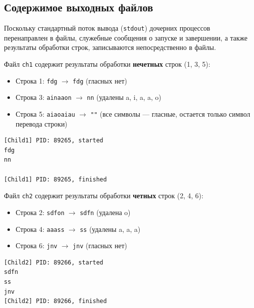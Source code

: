 \documentclass[pdf, unicode, 12pt, a4paper, oneside, fleqn]{article}
\begin{document}
\subsection*{Содержимое выходных файлов}

Поскольку стандартный поток вывода (\texttt{stdout}) дочерних процессов перенаправлен в файлы, служебные сообщения о запуске и завершении, а также результаты обработки строк, записываются непосредственно в файлы.

Файл \texttt{ch1} содержит результаты обработки \textbf{нечетных} строк (1, 3, 5):
\begin{itemize}
    \item Строка 1: \texttt{fdg} $\rightarrow$ \texttt{fdg} (гласных нет)
    \item Строка 3: \texttt{ainaaon} $\rightarrow$ \texttt{nn} (удалены a, i, a, a, o)
    \item Строка 5: \texttt{aiaoaiau} $\rightarrow$ \texttt{""} (все символы — гласные, остается только символ перевода строки)
\end{itemize}

\begin{lstlisting}[language=text, caption=Содержимое файла ch1]
[Child1] PID: 89265, started
fdg
nn

[Child1] PID: 89265, finished
\end{lstlisting}

Файл \texttt{ch2} содержит результаты обработки \textbf{четных} строк (2, 4, 6):
\begin{itemize}
    \item Строка 2: \texttt{sdfon} $\rightarrow$ \texttt{sdfn} (удалена o)
    \item Строка 4: \texttt{aaass} $\rightarrow$ \texttt{ss} (удалены a, a, a)
    \item Строка 6: \texttt{jnv} $\rightarrow$ \texttt{jnv} (гласных нет)
\end{itemize}

\begin{lstlisting}[language=text, caption=Содержимое файла ch2]
[Child2] PID: 89266, started
sdfn
ss
jnv
[Child2] PID: 89266, finished
\end{lstlisting}
\end{document}
